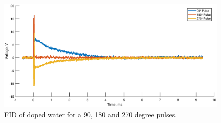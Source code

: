 \begin{figure}[H]
    \centering
    \includegraphics[width=\textwidth]{figures/B1/B1_1.eps}
    \caption{FID of doped water for a 90, 180 and 270 degree pulses.}
    \label{fig:B1:pulses}
\end{figure}



